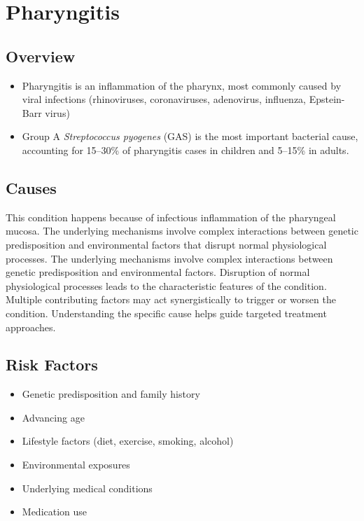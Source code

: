 \chapter{Pharyngitis}
\label{sec:Pharyngitis}

\section{Overview}


\begin{itemize}[noitemsep]
  \item Pharyngitis is an inflammation of the pharynx, most commonly caused by viral infections (rhinoviruses, coronaviruses, adenovirus, influenza, Epstein-Barr virus)
  \item Group A \textit{Streptococcus pyogenes} (GAS) is the most important bacterial cause, accounting for 15--30\% of pharyngitis cases in children and 5--15\% in adults.
\end{itemize}
\section{Causes}
This condition happens because of infectious inflammation of the pharyngeal mucosa. The underlying mechanisms involve complex interactions between genetic predisposition and environmental factors that disrupt normal physiological processes. The underlying mechanisms involve complex interactions between genetic predisposition and environmental factors. Disruption of normal physiological processes leads to the characteristic features of the condition. Multiple contributing factors may act synergistically to trigger or worsen the condition. Understanding the specific cause helps guide targeted treatment approaches.
\section{Risk Factors}


\begin{itemize}[noitemsep]
  \item Genetic predisposition and family history
  \item Advancing age
  \item Lifestyle factors (diet, exercise, smoking, alcohol)
  \item Environmental exposures
  \item Underlying medical conditions
  \item Medication use
\end{itemize}
